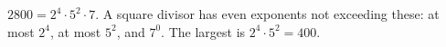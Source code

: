 $2800=2^4\cdot5^2\cdot7$. A square divisor has even exponents not exceeding these: at most $2^4$, at most $5^2$, and $7^0$. The largest is $2^4\cdot5^2=\boxed{400}$.
